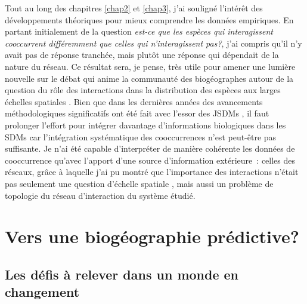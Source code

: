 Tout au long des chapitres \ref{chap2} et \ref{chap3}, j'ai souligné
l'intérêt des développements théoriques pour mieux comprendre les
données empiriques. En partant initialement de la question \emph{est-ce
que les espèces qui interagissent cooccurrent différemment que celles
qui n'interagissent pas?}, j'ai compris qu'il n'y avait pas de réponse
tranchée, mais plutôt une réponse qui dépendait de la nature du réseau.
Ce résultat sera, je pense, très utile pour amener une lumière nouvelle
sur le débat qui anime la communauté des biogéographes autour de la
question du rôle des interactions dans la distribution des espèces aux
larges échelles spatiales \citep{Araujo2014, Godsoe2015}. Bien que dans
les dernières années des avancements méthodologiques significatifs ont
été fait avec l'essor des JSDMs
\citep{Ovaskainen2010, Pollock2014, Warton2015b}, il faut prolonger
l'effort pour intégrer davantage d'informations biologiques dans les
SDMs car l'intégration systématique des cooccurrences n'est peut-être
pas suffisante. Je n'ai été capable d'interpréter de manière cohérente
les données de cooccurrence qu'avec l'apport d'une source d'information
extérieure~: celles des réseaux, grâce à laquelle j'ai pu montré que
l'importance des interactions n'était pas seulement une question
d'échelle spatiale \citep{Araujo2014, Belmaker2015}, mais aussi un
problème de topologie du réseau d'interaction du système étudié.

\section*{Vers une biogéographie
prédictive?}\label{vers-une-bioguxe9ographie-pruxe9dictive}

\subsection*{Les défis à relever dans un monde en
changement}\label{les-duxe9fis-uxe0-relever-dans-un-monde-en-changement}

